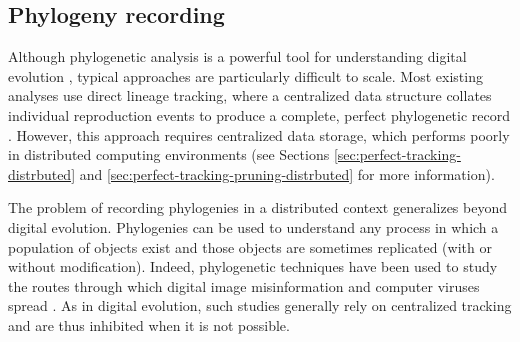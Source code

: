 \subsection{Phylogeny recording}

Although phylogenetic analysis is a powerful tool for understanding digital evolution \citep{dolson2020interpreting}, typical approaches are particularly difficult to scale.
Most existing analyses use direct lineage tracking, where a centralized data structure collates individual reproduction events to produce a complete, perfect phylogenetic record \citep{dolson2023phylotrackpy}.
However, this approach requires centralized data storage, which performs poorly in distributed computing environments (see Sections \ref{sec:perfect-tracking-distrbuted} and \ref{sec:perfect-tracking-pruning-distrbuted} for more information).

The problem of recording phylogenies in a distributed context generalizes beyond digital evolution.
Phylogenies can be used to understand any process in which a population of objects exist and those objects are sometimes replicated (with or without modification).
Indeed, phylogenetic techniques have been used to study the routes through which digital image misinformation and computer viruses spread \citep{friggeri2014rumor,cohen1987computer}.
As in digital evolution, such studies generally rely on centralized tracking and are thus inhibited when it is not possible.



